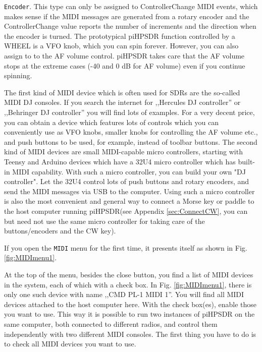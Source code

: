 \documentclass[12pt]{book}
\def\rett#1{\texttt{\color{red}#1}}
\def\bltt#1{\texttt{\color{blue}#1}}
\def\pH{pi\-HPSDR\xspace}
\begin{document}
\rett{Encoder}. This type can only be assigned to  ControllerChange MIDI events,
which makes sense if the MIDI messages are generated from a rotary encoder
and the ControllerChange value reports the number of increments and
the direction when the encoder is turned.
The prototypical \pH
function controlled by a WHEEL is a VFO knob, which you can spin forever. However,
you can also assign to to the AF volume control. \pH takes care that the
AF volume stops at the extreme cases (-40 and 0 dB for AF volume) even if you continue
spinning.

The first kind of MIDI device which is often used for SDRs are the so-called MIDI DJ
consoles. If you search the internet for ,,Hercules DJ controller'' or ,,Behringer
DJ controller'' you will find lots of examples. For a very decent price, you
can obtain a device which features lots of controls which you can conveniently use
as VFO knobs, smaller knobs for controlling the AF volume etc., and push buttons
to be used, for example, instead of toolbar buttons. The second kind of MIDI devices
are small MIDI-capable micro controllers, starting with Teensy and Arduino devices
which have a 32U4 micro controller which has built-in MIDI capability. With such a
micro controller, you can build your own "DJ controller". Let the 32U4 control
lots of push buttons and rotary encoders, and send the MIDI messages via USB to the
computer. Using such a micro controller is also the most convenient and general way
to connect a Morse key or paddle to the host computer running \pH (see
Appendix \ref{sec:ConnectCW}, you can but need not use the same micro controller
for taking care of the buttons/encoders and the CW key).

If you open the \bltt{MIDI} menu for the first time, it presents itself as shown
in Fig. \ref{fig:MIDImenu1}.

At the top of the menu, besides the close button, you find a list of MIDI devices
in the system, each of which with a check box. In Fig. \ref{fig:MIDImenu1}, there is only
one such device with name ,,CMD PL-1 MIDI 1''. You will find all MIDI devices attached
to the host computer here. With the check box(es), enable those you want to use.
This way it is possible to run two instances of \pH on the same computer, both
connected to different radios, and control them independently with two different MIDI
consoles. The first thing you have to do is to check all MIDI devices you want to use.
\end{document}
